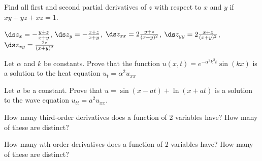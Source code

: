 \begin{exercises}
\exercise Find all first and second partial derivatives of
$z$ with respect to $x$ and $y$ if 
$xy+yz+xz=1$.
\begin{answer} $\ds z_x=-{y+z\over x+y}$, 
$\ds z_y=-{x+z\over x+y}$,\hfill\break 
$\ds z_{xx}=2{y+z\over(x+y)^2}$, 
$\ds z_{yy}=2{x+z\over(x+y)^2}$,\hfill\break 
$\ds z_{xy}={2z\over(x+y)^2}$
\end{answer}

\exercise Let $\alpha$ and $k$ be constants.  Prove that the function 
$u(x,t)=e^{-\alpha^2k^2t}\sin(kx)$
is a solution to the heat equation $u_t=\alpha^2u_{xx}$

\exercise Let $a$ be a constant.  Prove that $u=\sin(x-at)+\ln(x+at)$ is
  a solution to the wave equation $u_{tt}=a^2u_{xx}$.


\exercise How many third-order derivatives does a function of 2 variables
  have?  How many of these are distinct?

\exercise How many $n$th order derivatives does a function of 2 variables
  have?  How many of these are distinct?

\end{exercises}
